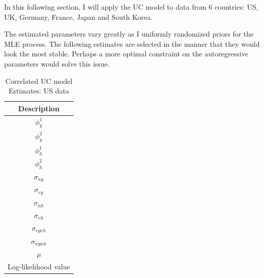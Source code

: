 \documentclass[fleqn]{article}
\begin{document}
\begin{outline}[enumerate]
In this following section, I will apply the UC model to data from 6 countries: US, UK, Germany, France, Japan and South Korea.

The estimated parameters vary greatly as I uniformly randomized priors for the MLE process. The following estimates are selected in the manner that they would look the most stable. Perhaps a more optimal constraint on the autoregressive parameters would solve this issue.

\pagebreak


\begin{table}
	\begin{center}
	\caption{Correlated UC model Estimates: US data}
	\begin{tabular}{c}
		\toprule
		Description\\
		\midrule
		$\phi^1_{y}$ \\
		$\phi^2_{y}$ \\		
		$\phi^1_{h}$ \\
		$\phi^2_{h}$ \\		
		$\sigma_{ny}$\\
		$\sigma_{ey}$\\
		$\sigma_{nh}$\\
		$\sigma_{eh}$\\
		$\sigma_{eyeh}$\\
		$\sigma_{nynh}$\\
		$\mu$\\
		Log-likelihood value\\
		\bottomrule
	\end{tabular}%
	\end{center}
\end{table}


\end{outline}
\end{document}
